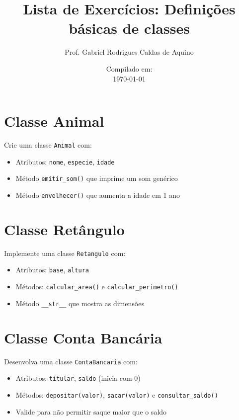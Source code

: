 \title{Lista de Exercícios: Definições básicas de classes}
\author{Prof. Gabriel Rodrigues Caldas de Aquino}

\date{Compilado em: \\ \today}



\maketitle

\section{Classe Animal}
Crie uma classe \texttt{Animal} com:
\begin{itemize}
\item Atributos: \texttt{nome}, \texttt{especie}, \texttt{idade}
\item Método \texttt{emitir\_som()} que imprime um som genérico
\item Método \texttt{envelhecer()} que aumenta a idade em 1 ano
\end{itemize}

\section{Classe Retângulo}
Implemente uma classe \texttt{Retangulo} com:
\begin{itemize}
\item Atributos: \texttt{base}, \texttt{altura}
\item Métodos: \texttt{calcular\_area()} e \texttt{calcular\_perimetro()}
\item Método \texttt{\_\_str\_\_} que mostra as dimensões
\end{itemize}

\section{Classe Conta Bancária}
Desenvolva uma classe \texttt{ContaBancaria} com:
\begin{itemize}
\item Atributos: \texttt{titular}, \texttt{saldo} (inicia com 0)
\item Métodos: \texttt{depositar(valor)}, \texttt{sacar(valor)} e \texttt{consultar\_saldo()}
\item Valide para não permitir saque maior que o saldo
\end{itemize}

